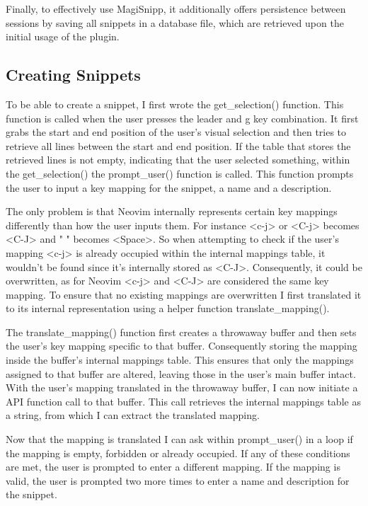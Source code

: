 \documentclass[runningheads]{llncs}
\begin{document}
Finally, to effectively use MagiSnipp, it additionally offers persistence between sessions by saving all snippets in a database file, 
which are retrieved upon the initial usage of the plugin.

\subsection{Creating Snippets}

To be able to create a snippet, I first wrote the get\_selection() function.
This function is called when the user presses the leader and g key combination.
It first grabs the start and end position of the user's visual selection and then tries to retrieve all lines between the start and end position.
If the table that stores the retrieved lines is not empty, indicating that the user selected something,
within the get\_selection() the prompt\_user() function is called.
This function prompts the user to input a key mapping for the snippet, a name and a description.

The only problem is that Neovim internally represents certain key mappings differently than how the user inputs them.
For instance <c-j> or <C-j> becomes <C-J> and " " becomes <Space>. So when attempting to check if the user's mapping <c-j> 
is already occupied within the internal mappings table, it wouldn't be found since it's internally stored as <C-J>. Consequently, 
it could be overwritten, as for Neovim <c-j> and <C-J> are considered the same key mapping.
To ensure that no existing mappings are overwritten I first translated it to its internal representation using a helper function translate\_mapping().

The translate\_mapping() function first creates a throwaway buffer and then sets the user's key mapping specific to that buffer. Consequently storing the mapping inside 
the buffer's internal mappings table.
This ensures that only the mappings assigned to that buffer are altered, leaving those in the user's main buffer intact.
With the user's mapping translated in the throwaway buffer, I can now initiate a API function call 
to that buffer. This call retrieves the internal mappings table as a string, from which I can extract the translated mapping.

Now that the mapping is translated I can ask within prompt\_user() in a loop if the mapping is empty, forbidden or already occupied.
If any of these conditions are met, the user is prompted to enter a different mapping. 
If the mapping is valid, the user is prompted two more times to enter a name and description for the snippet.
\end{document}
